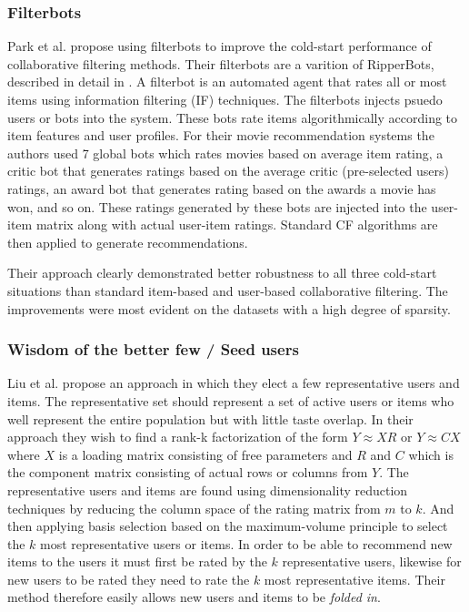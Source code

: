 \subsubsection{Filterbots}


Park et al. \cite{Park2006} propose using filterbots to improve the cold-start
performance of collaborative filtering methods. Their filterbots are a varition
of RipperBots, described in detail in \cite{Good1999}. A filterbot is an
automated agent that rates all or most items using information filtering (IF)
techniques. The filterbots injects psuedo users or bots into the system. These
bots rate items algorithmically according to item features and user profiles.
For their movie recommendation systems the authors used 7 global bots which
rates movies based on average item rating, a critic bot that generates ratings
based on the average critic (pre-selected users) ratings, an award bot that
generates rating based on the awards a movie has won, and so on. These ratings
generated by these bots are injected into the user-item matrix along with
actual user-item ratings. Standard CF algorithms are then applied to generate
recommendations.

Their approach clearly demonstrated better robustness to all three cold-start situations than standard item-based
and user-based collaborative filtering. The improvements were most evident on
the datasets with a high degree of sparsity.


\subsubsection{Wisdom of the better few / Seed users}


Liu et al. \cite{Liu2011} propose an approach in which they elect a few
representative users and items. The representative set should represent a set
of active users or items who well represent the entire population but with
little taste overlap. In their approach they wish to find a rank-k
factorization of the form $Y \approx XR$ or $Y \approx CX$ where $X$ is a
loading matrix consisting of free parameters and $R$ and $C$ which is the
component matrix consisting of actual rows or columns from $Y$. The
representative users and items are found using dimensionality reduction
techniques by reducing the column space of the rating matrix from $m$ to $k$.
And then applying basis selection based on the maximum-volume principle to
select the $k$ most representative users or items. In order to be able to
recommend new items to the users it must first be rated by the $k$
representative users, likewise for new users to be rated they need to rate the
$k$ most representative items. Their method therefore easily allows new users
and items to be \emph{folded in}.

